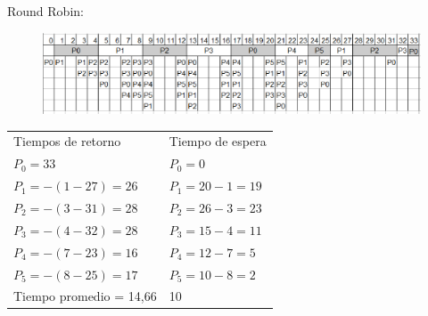 \documentclass[twoside, a4paper]{article}
\begin{document}
Round Robin:\\
\begin{figure}[!htb]
\includegraphics[scale=0.60]{Round-Robin.eps}
\end{figure}
\begin{tabular}{l l}
Tiempos de retorno 		& Tiempo de espera\\
$P_0 = 33$   		 	& $P_0 = 0$ \\
$P_1 =-(1 - 27)= 26$ 	& $P_1 = 20-1= 19$ \\
$P_2 =-(3 - 31)= 28$ 	& $P_2 = 26-3= 23$\\
$P_3 =-(4 - 32)= 28$ 	& $P_3 = 15-4= 11$\\
$P_4 =-(7 - 23)= 16$ 	& $P_4 = 12-7= 5$\\
$P_5 =-(8 - 25)= 17$ 	& $P_5 = 10-8= 2$\\
Tiempo promedio = 14,66 & 10
\end{tabular}
\end{document}
